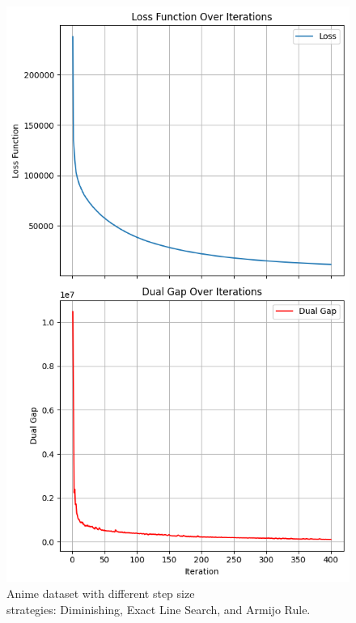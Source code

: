 \documentclass[12pt]{beamer}
\begin{document}
\begin{frame}
\begin{figure}[H]
        \includegraphics[height=0.75\textheight]{image/anime_loss_gap_armijo.png}
        \caption{Anime dataset with different step size \\
        strategies: Diminishing, Exact Line Search, and Armijo Rule.}
    \end{figure}
\end{frame}
\end{document}
